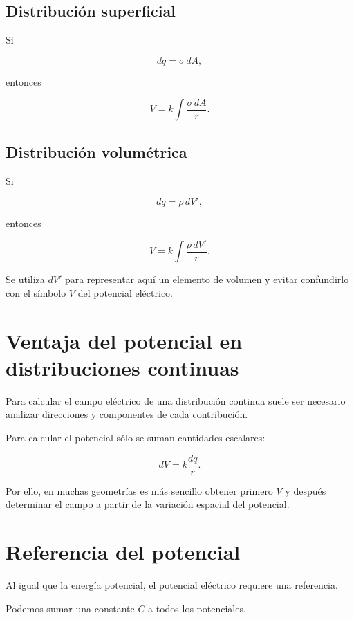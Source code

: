 \subsection{Distribución superficial}

Si

\[
dq=\sigma\,dA,
\]

entonces

\begin{equation}
\boxed{
V=k\int\frac{\sigma\,dA}{r}
}.
\end{equation}


\subsection{Distribución volumétrica}

Si

\[
dq=\rho\,dV',
\]

entonces

\begin{equation}
\boxed{
V=k\int\frac{\rho\,dV'}{r}
}.
\end{equation}

Se utiliza \(dV'\) para representar aquí un elemento de volumen y evitar confundirlo
con el símbolo \(V\) del potencial eléctrico.


\section{Ventaja del potencial en distribuciones continuas}

Para calcular el campo eléctrico de una distribución continua suele ser necesario
analizar direcciones y componentes de cada contribución.

Para calcular el potencial sólo se suman cantidades escalares:

\[
dV=k\frac{dq}{r}.
\]

Por ello, en muchas geometrías es más sencillo obtener primero \(V\) y después
determinar el campo a partir de la variación espacial del potencial.


\section{Referencia del potencial}

Al igual que la energía potencial, el potencial eléctrico requiere una referencia.

Podemos sumar una constante \(C\) a todos los potenciales,

